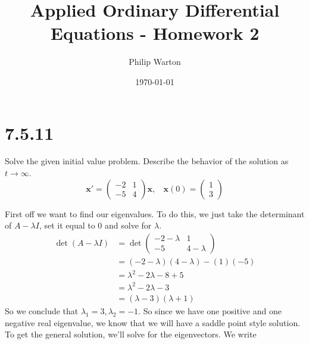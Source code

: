 \documentclass{article}
\theoremstyle{definition}
\begin{document}
\title{Applied Ordinary Differential Equations - Homework 2}
\author{Philip Warton}
\date{\today}
\maketitle
\section*{7.5.11}
    \begin{mdframed}[]
        Solve the given initial value problem. Describe the behavior of the solution as $t \rightarrow \infty$.
        \[
            \bm x' = 
            \begin{pmatrix}
                -2 & 1 \\
                -5 & 4
            \end{pmatrix}
            \bm x, \ \ \ \ 
            \bm x (0) =
            \begin{pmatrix}
                1 \\
                3
            \end{pmatrix}
        \]
    \end{mdframed}
    First off we want to find our eigenvalues. To do this, we just take the determinant of $A - \lambda I$, set it 
    equal to 0 and solve for $\lambda$. 
    \begin{align*}
        \det (A - \lambda I) &= \det \begin{pmatrix}
            -2 - \lambda & 1 \\
            -5 & 4 - \lambda
        \end{pmatrix} \\
        &= (-2 - \lambda)(4 - \lambda) - (1)(-5) \\
        &= \lambda^2 - 2\lambda - 8 + 5 \\
        &= \lambda^2 - 2\lambda - 3 \\
        &= (\lambda - 3)(\lambda + 1)
    \end{align*}
    So we conclude that $\lambda_1 = 3, \lambda_2 = -1$. So since we have one positive and one negative real eigenvalue,
    we know that we will have a saddle point style solution. To get the general solution, we'll solve for the eigenvectors.
    We write
\end{document}
